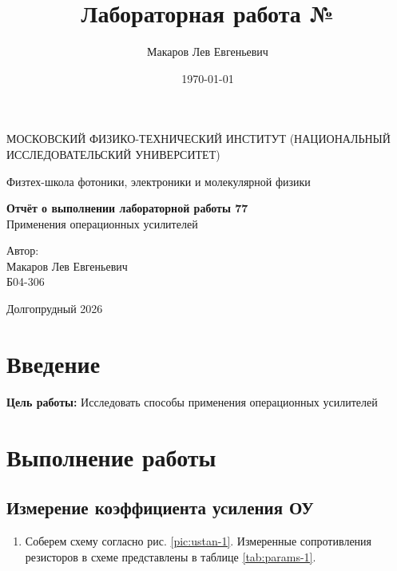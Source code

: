 \documentclass[a4paper,12pt]{article}
\author{Макаров Лев Евгеньевич}
\title{Лабораторная работа №\labnumber\\\labname}
\date{\today}
\newcommand\labname{Применения операционных усилителей}
\newcommand\labnumber{77}
\begin{document}
\begin{titlepage}
    \begin{center}
        {\large МОСКОВСКИЙ ФИЗИКО-ТЕХНИЧЕСКИЙ ИНСТИТУТ (НАЦИОНАЛЬНЫЙ ИССЛЕДОВАТЕЛЬСКИЙ УНИВЕРСИТЕТ)}
    \end{center}
    \begin{center}
        {\large Физтех-школа фотоники, электроники и молекулярной физики}
    \end{center}

    \vspace{4.5cm}
    {\huge
        \begin{center}
            {\bf Отчёт о выполнении лабораторной работы \labnumber}\\
            \labname
        \end{center}
    }
    \vspace{2cm}
    \begin{flushright}
        {\LARGE Автор:\\ Макаров Лев Евгеньевич\\
        \vspace{0.2cm}
        Б04-306}
    \end{flushright}
    \vspace{8cm}
    \begin{center}
        Долгопрудный 2026
    \end{center}
\end{titlepage}

\section{Введение}


\textbf{Цель работы:} Исследовать способы применения операционных усилителей

\section{Выполнение работы}

\subsection*{Измерение коэффициента усиления ОУ}

\begin{enumerate}
    \item Соберем схему согласно рис. \ref{pic:ustan-1}. Измеренные сопротивления резисторов в схеме представлены в таблице \ref{tab:params-1}.
\end{enumerate}
\end{document}
